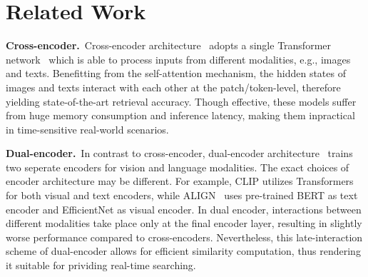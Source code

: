 \section{Related Work}
\textbf{Cross-encoder.}~Cross-encoder architecture~\cite{tan-bansal-2019-lxmert,uniter,oscar} adopts a single Transformer network~\cite{NIPS2017_3f5ee243} which is able to process inputs from different modalities, e.g., images and texts. Benefitting from the self-attention mechanism, the hidden states of images and texts 
interact with each other at the patch/token-level, therefore yielding state-of-the-art retrieval accuracy. Though effective, these models suffer from huge memory consumption and inference latency, making them inpractical in time-sensitive real-world scenarios.


\textbf{Dual-encoder.}~In contrast to cross-encoder, dual-encoder architecture~\cite{clip,align} trains two seperate encoders for vision and language modalities. The exact choices of encoder architecture may be different. For example, CLIP utilizes Transformers for both visual and text encoders, while ALIGN~\cite{align} uses pre-trained BERT as text encoder and EfficientNet as visual encoder. In dual encoder, interactions between different 
modalities take place only at the final encoder layer, resulting in slightly worse performance compared to cross-encoders. Nevertheless, this late-interaction scheme of dual-encoder allows for efficient similarity computation, thus rendering it suitable for prividing real-time searching.
